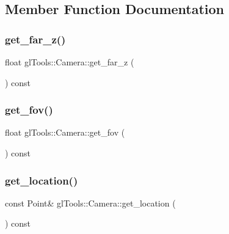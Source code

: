 \subsection{Member Function Documentation}
\mbox{\label{classgl_tools_1_1_camera_ac5ac244038c871b6796dcaf64a8bd1fd}} 
\subsubsection{get\_far\_z()}
{\footnotesize\ttfamily float gl\+Tools\+::\+Camera\+::get\+\_\+far\+\_\+z (\begin{DoxyParamCaption}{ }\end{DoxyParamCaption}) const\hspace{0.3cm}{\ttfamily [inline]}}

\mbox{\label{classgl_tools_1_1_camera_a0e732db6f4de5b2c0dbdc43319260970}} 
\subsubsection{get\_fov()}
{\footnotesize\ttfamily float gl\+Tools\+::\+Camera\+::get\+\_\+fov (\begin{DoxyParamCaption}{ }\end{DoxyParamCaption}) const\hspace{0.3cm}{\ttfamily [inline]}}

\mbox{\label{classgl_tools_1_1_camera_a69b2b7b2b432de25f9e5f340d7885cf9}} 
\subsubsection{get\_location()}
{\footnotesize\ttfamily const Point\& gl\+Tools\+::\+Camera\+::get\+\_\+location (\begin{DoxyParamCaption}{ }\end{DoxyParamCaption}) const\hspace{0.3cm}{\ttfamily [inline]}}

\mbox{\label{classgl_tools_1_1_camera_ab559d77dc787283894da4b5f33a741ad}} 
